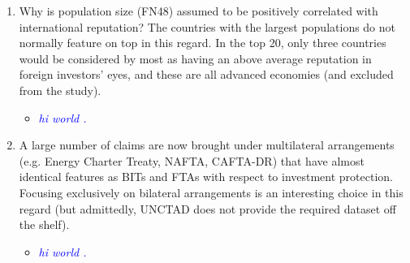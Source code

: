 \begin{enumerate}
	\item Why is population size (FN48) assumed to be positively correlated with international reputation? The countries with the largest populations do not normally feature on top in this regard. In the top 20, only three countries would be considered by most as having an above average reputation in foreign investors' eyes, and these are all advanced economies (and excluded from the study). 
	\begin{itemize}
		\item \textcolor{blue}{ \emph{ hi world . }}
	\end{itemize}
	\item A large number of claims are now brought under multilateral arrangements (e.g. Energy Charter Treaty, NAFTA, CAFTA-DR) that have almost identical features as BITs and FTAs with respect to investment protection. Focusing exclusively on bilateral arrangements is an interesting choice in this regard (but admittedly, UNCTAD does not provide the required dataset off the shelf). 		
	\begin{itemize}
		\item \textcolor{blue}{ \emph{ hi world . }}
	\end{itemize}	
\end{enumerate}
